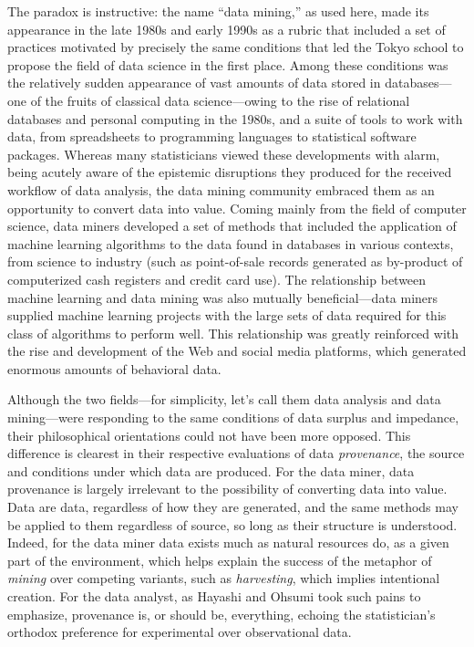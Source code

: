 \documentclass[
  letterpaper,
]{report}
\begin{document}
The paradox is instructive: the name ``data mining,'' as used here, made
its appearance in the late 1980s and early 1990s as a rubric that
included a set of practices motivated by precisely the same conditions
that led the Tokyo school to propose the field of data science in the
first place. Among these conditions was the relatively sudden appearance
of vast amounts of data stored in databases---one of the fruits of
classical data science---owing to the rise of relational databases and
personal computing in the 1980s, and a suite of tools to work with data,
from spreadsheets to programming languages to statistical software
packages. Whereas many statisticians viewed these developments with
alarm, being acutely aware of the epistemic disruptions they produced
for the received workflow of data analysis, the data mining community
embraced them as an opportunity to convert data into value. Coming
mainly from the field of computer science, data miners developed a set
of methods that included the application of machine learning algorithms
to the data found in databases in various contexts, from science to
industry (such as point-of-sale records generated as by-product of
computerized cash registers and credit card use). The relationship
between machine learning and data mining was also mutually
beneficial---data miners supplied machine learning projects with the
large sets of data required for this class of algorithms to perform
well. This relationship was greatly reinforced with the rise and
development of the Web and social media platforms, which generated
enormous amounts of behavioral data.

Although the two fields---for simplicity, let's call them data analysis
and data mining---were responding to the same conditions of data surplus
and impedance, their philosophical orientations could not have been more
opposed. This difference is clearest in their respective evaluations of
data \emph{provenance}, the source and conditions under which data are
produced. For the data miner, data provenance is largely irrelevant to
the possibility of converting data into value. Data are data, regardless
of how they are generated, and the same methods may be applied to them
regardless of source, so long as their structure is understood. Indeed,
for the data miner data exists much as natural resources do, as a given
part of the environment, which helps explain the success of the metaphor
of \emph{mining} over competing variants, such as \emph{harvesting},
which implies intentional creation. For the data analyst, as Hayashi and
Ohsumi took such pains to emphasize, provenance is, or should be,
everything, echoing the statistician's orthodox preference for
experimental over observational data.
\end{document}
